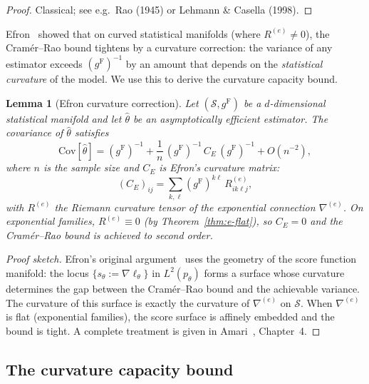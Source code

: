 \documentclass[11pt]{article}
\newcommand{\Cov}{\mathrm{Cov}}
\newcommand{\gF}{g^{\mathrm{F}}}
\newtheorem{lemma}{Lemma}
\theoremstyle{remark}
\begin{document}
\begin{proof}
Classical; see e.g.\ Rao (1945) or Lehmann \& Casella (1998).
\end{proof}

Efron~\cite{efron1975} showed that on curved statistical manifolds (where
$R^{(e)} \neq 0$), the Cram\'er--Rao bound tightens by a curvature correction:
the variance of any estimator exceeds $(\gF)^{-1}$ by an amount that depends on
the \emph{statistical curvature} of the model.  We use this to derive the
curvature capacity bound.

\begin{lemma}[Efron curvature correction]\label{lem:efron}
Let $(\mathcal{S}, \gF)$ be a $d$-dimensional statistical manifold and let
$\hat\theta$ be an asymptotically efficient estimator.  The covariance of
$\hat\theta$ satisfies
\begin{equation}\label{eq:efron-correction}
\Cov[\hat\theta] = (\gF)^{-1}
+ \frac{1}{n}\,(\gF)^{-1}\, C_E\, (\gF)^{-1}
+ O(n^{-2}),
\end{equation}
where $n$ is the sample size and $C_E$ is Efron's curvature matrix:
\[
(C_E)_{ij} = \sum_{k,\ell}
(\gF)^{k\ell}\, R^{(e)}_{ik\ell j},
\]
with $R^{(e)}$ the Riemann curvature tensor of the exponential connection
$\nabla^{(e)}$.  On exponential families, $R^{(e)} \equiv 0$ (by
Theorem~\ref{thm:e-flat}), so $C_E = 0$ and the Cram\'er--Rao bound is
achieved to second order.
\end{lemma}

\begin{proof}[Proof sketch]
Efron's original argument~\cite{efron1975} uses the geometry of the score
function manifold: the locus $\{s_\theta := \nabla \ell_\theta\}$ in
$L^2(p_\theta)$ forms a surface whose curvature determines the gap between
the Cram\'er--Rao bound and the achievable variance.  The curvature of this
surface is exactly the curvature of $\nabla^{(e)}$ on $\mathcal{S}$.  When
$\nabla^{(e)}$ is flat (exponential families), the score surface is affinely
embedded and the bound is tight.  A complete treatment is given in
Amari~\cite{amari1985}, Chapter~4.
\end{proof}

\subsection{The curvature capacity bound}
\end{document}

